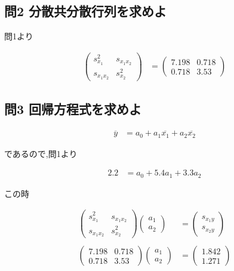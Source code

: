 \documentclass[dvipdfmx,autodetect-engine,titlepage]{jsarticle}
\begin{document}
\subsection*{問2 分散共分散行列を求めよ}

問1より

\begin{align*}
  \begin{pmatrix}
    s_{x_1}^2 & s_{x_{1}x_{2}} \\
    s_{x_{1}x_{2}} & s_{x_2}^2 
  \end{pmatrix}
    &=
  \begin{pmatrix}
    7.198 & 0.718 \\
    0.718 & 3.53 
  \end{pmatrix}
\end{align*}


\subsection*{問3 回帰方程式を求めよ}

\begin{align*}
  \overline{y} &=  a_0 + a_{1}\overline{x_1} + a_{2}\overline{x_2}
\end{align*}

であるので,問1より

\begin{align}
  2.2 &= a_0 + 5.4a_1 + 3.3a_2
\end{align}

この時

\begin{align*}
  \begin{pmatrix}
    s_{x_1}^2 & s_{x_{1}x_{2}} \\
    s_{x_{1}x_{2}} & s_{x_2}^2 
  \end{pmatrix}
  \begin{pmatrix}
    a_1\\
    a_2
  \end{pmatrix}
  &=
  \begin{pmatrix}
    s_{x_{1}y}\\
    s_{x_{2}y}
  \end{pmatrix}
  \\\\
  \begin{pmatrix}
    7.198 & 0.718 \\
    0.718 & 3.53 
  \end{pmatrix}
  \begin{pmatrix}
    a_1\\
    a_2
  \end{pmatrix}
  &=
  \begin{pmatrix}
    1.842\\
    1.271
  \end{pmatrix}
\end{align*}
\end{document}
